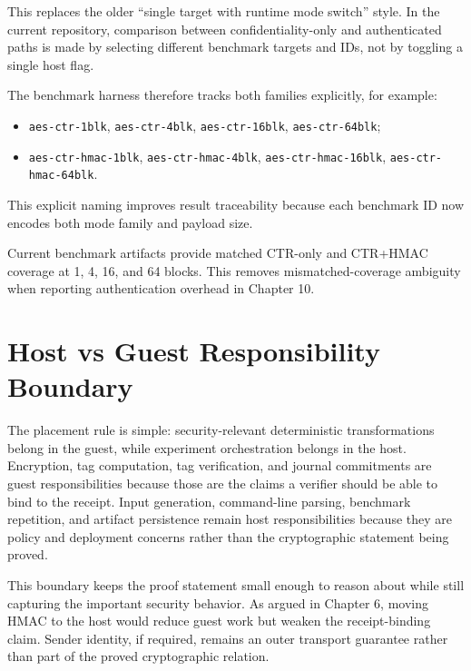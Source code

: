 This replaces the older ``single target with runtime mode switch'' style. In the
current repository, comparison between confidentiality-only and authenticated
paths is made by selecting different benchmark targets and IDs, not by toggling
a single host flag.

The benchmark harness therefore tracks both families explicitly, for example:

\begin{itemize}
\item \texttt{aes-ctr-1blk}, \texttt{aes-ctr-4blk}, \texttt{aes-ctr-16blk},
\texttt{aes-ctr-64blk};
\item \texttt{aes-ctr-hmac-1blk}, \texttt{aes-ctr-hmac-4blk},
\texttt{aes-ctr-hmac-16blk}, \texttt{aes-ctr-hmac-64blk}.
\end{itemize}

This explicit naming improves result traceability because each benchmark ID now
encodes both mode family and payload size.

Current benchmark artifacts provide matched CTR-only and CTR+HMAC coverage at 1,
4, 16, and 64 blocks. This removes mismatched-coverage ambiguity when reporting
authentication overhead in Chapter 10.

\section{Host vs Guest Responsibility Boundary}

The placement rule is simple: security-relevant deterministic transformations
belong in the guest, while experiment orchestration belongs in the host.
Encryption, tag computation, tag verification, and journal commitments are guest
responsibilities because those are the claims a verifier should be able to bind
to the receipt. Input generation, command-line parsing, benchmark repetition,
and artifact persistence remain host responsibilities because they are policy and
deployment concerns rather than the cryptographic statement being proved.

This boundary keeps the proof statement small enough to reason about while still
capturing the important security behavior. As argued in Chapter 6, moving HMAC to
the host would reduce guest work but weaken the receipt-binding claim. Sender
identity, if required, remains an outer transport guarantee rather than part of
the proved cryptographic relation.
